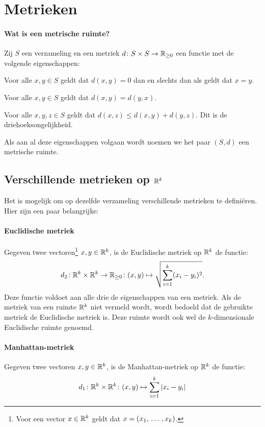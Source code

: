 \section{Metrieken}

\paragraph{Wat is een metrische ruimte?} Zij \(S\) een verzameling en een metriek \(d\colon S\times S\to \mathbb{R}_{\geq0}\) een functie met de volgende eigenschappen:
\begin{enum}[i.]
    \item Voor alle \(x,y\in S\) geldt dat \(d(x,y)=0\) dan en slechts dan als geldt dat \(x=y\).
    \item Voor alle \(x,y\in S\) geldt dat \(d(x,y)=d(y,x)\).
    \item Voor alle \(x,y,z\in S\) geldt dat \(d(x,z)\leq d(x,y)+d(y,z)\). Dit is de driehoeksongelijkheid.
\end{enum}
Als aan al deze eigenschappen volgaan wordt noemen we het paar \((S,d)\) een metrische ruimte.

\subsection{Verschillende metrieken op \texorpdfstring{\(\mathbb{R}^{k}\)}{rk}}
Het is mogelijk om op dezelfde verzameling verschillende metrieken te definiëren. Hier zijn een paar belangrijke:

\paragraph{Euclidische metriek} Gegeven twee vectoren\footnote{Voor een vector \(x\in\mathbb{R}^{k}\) geldt dat \(x=(x_{1},\,\dots\,,x_{k})\).} \(x,y\in\mathbb{R}^{k}\), is de Euclidische metriek op \(\mathbb{R}^{k}\) de functie:
\[
    d_{2}\colon\mathbb{R}^{k}\times\mathbb{R}^{k}\to\mathbb{R}_{\geq0}\colon(x,y)\mapsto\sqrt{\sum\limits_{i=1}^{k}(x_{i}-y_{i})^{2}}.
\]
Deze functie voldoet aan alle drie de eigenschappen van een metriek. Als de metriek van een ruimte \(\mathbb{R}^{k}\) niet vermeld wordt, wordt bedoeld dat de gebruikte metriek de Euclidische metriek is. Deze ruimte wordt ook wel de \(k\)-dimensionale Euclidische ruimte genoemd.

\paragraph{Manhattan-metriek} Gegeven twee vectoren \(x,y\in\mathbb{R}^{k}\), is de Manhattan-metriek op \(\mathbb{R}^{k}\) de functie:
\[
    d_{1}\colon\mathbb{R}^{k}\times\mathbb{R}^{k}\colon(x,y)\mapsto\sum\limits_{i=1}^{k}|x_{i}-y_{i}|
\]


